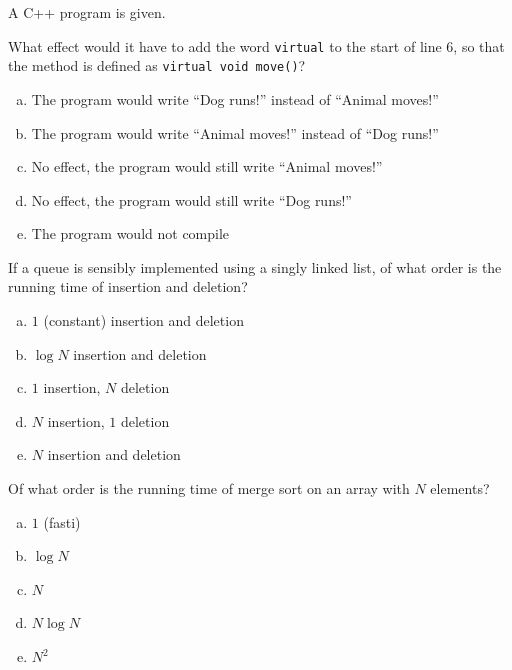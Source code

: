 \documentclass[addpoints]{exam}
\begin{document}
\begin{questions}
	\newpage

	\question[3]

	A C++ program is given.


	What effect would it have to add the word \texttt{virtual} to the start of line 6, so that the method is defined as \texttt{virtual void move()}?

	\begin{enumerate}[a)]
		\item The program would write ``Dog runs!'' instead of ``Animal moves!''
		\item The program would write ``Animal moves!'' instead of ``Dog runs!''
		\item No effect, the program would still write ``Animal moves!''
		\item No effect, the program would still write ``Dog runs!''
		\item The program would not compile
	\end{enumerate}

	\question[3]

	If a queue is sensibly implemented using a singly linked list, of what order is the running time of insertion and deletion?

	\begin{enumerate}[a)]
		\item  $1$ (constant) insertion and deletion
		\item  $\log N$ insertion and deletion
		\item  $1$ insertion, $N$ deletion
		\item  $N$ insertion, $1$ deletion
		\item  $N$ insertion and deletion
	\end{enumerate}

	\newpage

	\question[3]

	Of what order is the running time of merge sort on an array with $N$ elements?

	\begin{multicols}{5}
		\begin{enumerate}[a)]
			\item $1$ (fasti)
			\item $\log N$
			\item $N$
			\item $N\log N$
			\item $N^2$
		\end{enumerate}
	\end{multicols}


\end{questions}
\end{document}
